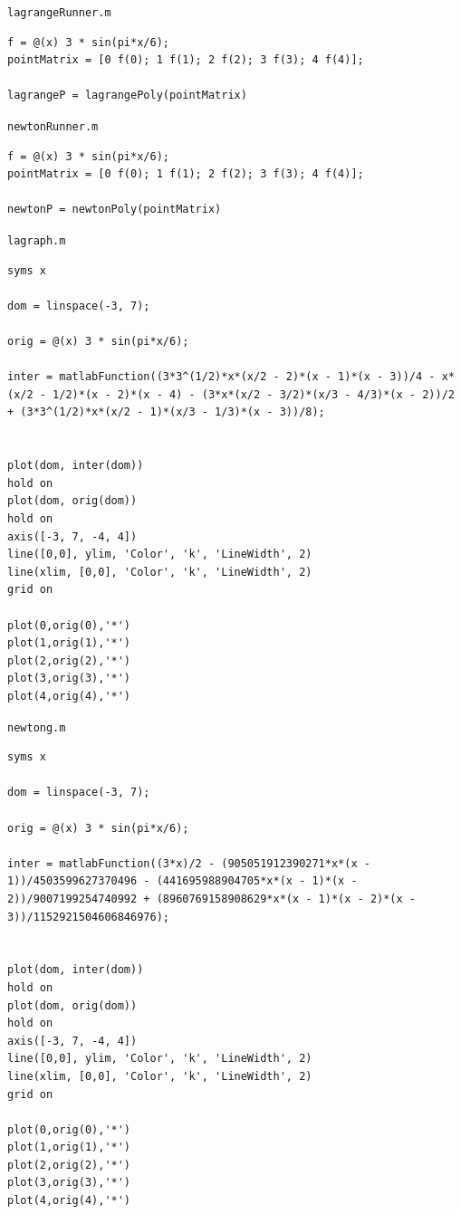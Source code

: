 \documentclass[english,notitlepage,letterpaper, 10pt]{article} %
\begin{document}
\texttt{lagrangeRunner.m}
\begin{lstlisting}
f = @(x) 3 * sin(pi*x/6);
pointMatrix = [0 f(0); 1 f(1); 2 f(2); 3 f(3); 4 f(4)];
  
lagrangeP = lagrangePoly(pointMatrix)
\end{lstlisting}

\texttt{newtonRunner.m}
\begin{lstlisting}
f = @(x) 3 * sin(pi*x/6);
pointMatrix = [0 f(0); 1 f(1); 2 f(2); 3 f(3); 4 f(4)];

newtonP = newtonPoly(pointMatrix)
\end{lstlisting}

\texttt{lagraph.m}
\begin{lstlisting}
syms x

dom = linspace(-3, 7);

orig = @(x) 3 * sin(pi*x/6);

inter = matlabFunction((3*3^(1/2)*x*(x/2 - 2)*(x - 1)*(x - 3))/4 - x*(x/2 - 1/2)*(x - 2)*(x - 4) - (3*x*(x/2 - 3/2)*(x/3 - 4/3)*(x - 2))/2 + (3*3^(1/2)*x*(x/2 - 1)*(x/3 - 1/3)*(x - 3))/8);


plot(dom, inter(dom))
hold on
plot(dom, orig(dom))
hold on
axis([-3, 7, -4, 4])
line([0,0], ylim, 'Color', 'k', 'LineWidth', 2)
line(xlim, [0,0], 'Color', 'k', 'LineWidth', 2) 
grid on

plot(0,orig(0),'*')
plot(1,orig(1),'*')
plot(2,orig(2),'*')
plot(3,orig(3),'*')
plot(4,orig(4),'*')
\end{lstlisting}

\texttt{newtong.m}
\begin{lstlisting}
syms x

dom = linspace(-3, 7);

orig = @(x) 3 * sin(pi*x/6);

inter = matlabFunction((3*x)/2 - (905051912390271*x*(x - 1))/4503599627370496 - (441695988904705*x*(x - 1)*(x - 2))/9007199254740992 + (8960769158908629*x*(x - 1)*(x - 2)*(x - 3))/1152921504606846976);


plot(dom, inter(dom))
hold on
plot(dom, orig(dom))
hold on
axis([-3, 7, -4, 4])
line([0,0], ylim, 'Color', 'k', 'LineWidth', 2)
line(xlim, [0,0], 'Color', 'k', 'LineWidth', 2) 
grid on

plot(0,orig(0),'*')
plot(1,orig(1),'*')
plot(2,orig(2),'*')
plot(3,orig(3),'*')
plot(4,orig(4),'*')

\end{lstlisting}
\end{document}
